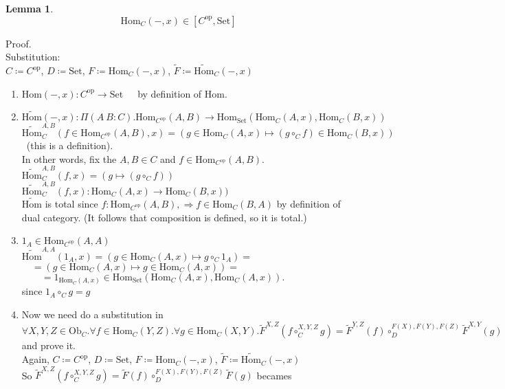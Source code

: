 \documentclass[10pt,a4paper]{article}
\theoremstyle{definition}
\newtheorem{lemma}{Lemma}[section]
\newcommand{\Ob}{{\mbox{Ob}}}
\newcommand{\Hom}{{\mbox{Hom}}}
\newcommand{\HomMor}{{\widetilde{\Hom}\mbox{}}}
\newcommand{\FMor}{{\widetilde{F}\mbox{}}}
\newcommand{\op}{{\mbox{op}}}
\newcommand{\Set}{{\mbox{Set}}}
\begin{document}
\begin{lemma}
$$\Hom_C(-, x) \in [C^\op,\Set]$$
\end{lemma}

\noindent Proof.\\
Substitution:\\
$C \coloneqq C^\op$, 
$D \coloneqq \Set$, 
$F \coloneqq \Hom_C(-,x)$, 
$\FMor \coloneqq \HomMor_C(-,x)$\\
\begin{enumerate}
\item $\Hom(-, x) : C^\op \to \Set$\ \ \ by definition of $\Hom$.
\item $\HomMor(-, x) :\Pi(A\ B:C).\Hom_{C^\op}(A,B) \to \Hom_\Set(\Hom_C(A,x), \Hom_C(B,x))$\\
$\HomMor_C^{A,B}(f\in\Hom_{C^\op}(A,B), x) = (g \in\Hom_C(A,x) \mapsto (g \circ_C f) \in\Hom_C(B,x))$\ (this is a definition).\\
In other words, fix the $A,B\in C$ and $f\in\Hom_{C^\op}(A,B)$.\\
$\HomMor_C^{A,B}(f, x) = (g\mapsto (g \circ_C f))$\\
$\HomMor_C^{A,B}(f, x) : \Hom_C(A,x) \to \Hom_C(B,x))$
\\
$\HomMor$ is total since $f:\Hom_{C^\op}(A,B), \Rightarrow f\in\Hom_C(B,A)$ by definition of dual category. (It follows that composition is defined, so it is total.)
\item $1_A\in\Hom_{C^\op}(A,A)$\\
$\HomMor^{A,A}(1_A, x) = \left(g \in\Hom_C(A,x)\mapsto g \circ_C 1_A\right) = $\\
$\quad = \left(g \in\Hom_C(A,x) \mapsto g \in\Hom_C(A,x)\right) =$\\
$\quad \quad = 1_{\Hom_C(A,x)} \in \Hom_\Set\left(\Hom_C(A,x), \Hom_C(A,x)\right).$\\
since $1_A \circ_C g = g$\\
\item Now we need do a substitution in
$\forall X,Y,Z \in \Ob_C.\forall f\in\Hom_C(Y,Z).\forall g\in\Hom_C(X,Y). \FMor^{X,Z}(f\circ_C^{X,Y,Z} g)=\FMor^{Y,Z}(f)\circ_D^{F(X),F(Y),F(Z)} \FMor^{X,Y}(g)$ and prove it.\\
Again, $C \coloneqq C^\op$, 
$D \coloneqq \Set$, 
$F \coloneqq \Hom_C(-,x)$, 
$\FMor \coloneqq \HomMor_C(-,x)$\\
So $\FMor^{X,Z}(f\circ_C^{X,Y,Z} g)=\FMor(f)\circ_D^{F(X),F(Y),F(Z)} \FMor(g)$ becames\\

\end{enumerate}
\end{document}
